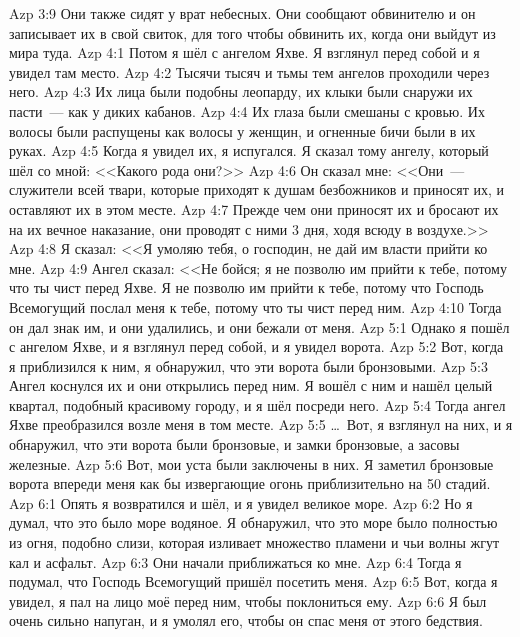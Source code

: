 \vs Azp 3:9
Они также сидят у врат небесных.
Они сообщают обвинителю и он записывает их в свой свиток,
для того чтобы обвинить их, когда они выйдут из мира туда.
\vs Azp 4:1
Потом я шёл с ангелом Яхве.
Я взглянул перед собой и я увидел там место.
\vs Azp 4:2
Тысячи тысяч и тьмы тем ангелов проходили через него.
\vs Azp 4:3
Их лица были подобны леопарду,
их клыки были снаружи их пасти~--- как у диких кабанов.
\vs Azp 4:4
Их глаза были смешаны с кровью.
Их волосы были распущены как волосы у женщин,
и огненные бичи были в их руках.
\vs Azp 4:5
Когда я увидел их, я испугался.
Я сказал тому ангелу, который шёл со мной:
<<Какого рода они?>>
\vs Azp 4:6
Он сказал мне:
<<Они~--- служители всей твари, которые приходят
к душам безбожников и приносят их,
и оставляют их в этом месте.
\vs Azp 4:7
Прежде чем они приносят их и бросают их
на их вечное наказание, они проводят с ними 3 дня,
ходя всюду в воздухе.>>
\vs Azp 4:8
Я сказал:
<<Я умоляю тебя, о господин, не дай им власти прийти ко мне.
\vs Azp 4:9
Ангел сказал:
<<Не бойся; я не позволю им прийти к тебе,
потому что ты чист перед Яхве.
Я не позволю им прийти к тебе,
потому что Господь Всемогущий послал меня к тебе,
потому что ты чист перед ним.
\vs Azp 4:10
Тогда он дал знак им, и они удалились, и они бежали от меня.
\vs Azp 5:1
Однако я пошёл с ангелом Яхве,
и я взглянул перед собой, и я увидел ворота.
\vs Azp 5:2
Вот, когда я приблизился к ним, я обнаружил,
что эти ворота были бронзовыми.
\vs Azp 5:3
Ангел коснулся их и они открылись перед ним.
Я вошёл с ним и нашёл целый квартал,
подобный красивому городу, и я шёл посреди него.
\vs Azp 5:4
Тогда ангел Яхве преобразился возле меня в том месте.
\vs Azp 5:5
\ldots\ Вот, я взглянул на них, и я обнаружил,
что эти ворота были бронзовые, и замки бронзовые,
а засовы железные.
\vs Azp 5:6
Вот, мои уста были заключены в них.
Я заметил бронзовые ворота впереди меня
как бы извергающие огонь приблизительно на 50 стадий.
\vs Azp 6:1
Опять я возвратился и шёл,
и я увидел великое море.
\vs Azp 6:2
Но я думал, что это было море водяное.
Я обнаружил, что это море было полностью из огня,
подобно слизи, которая изливает множество пламени
и чьи волны жгут кал и асфальт.
\vs Azp 6:3
Они начали приближаться ко мне.
\vs Azp 6:4
Тогда я подумал, что Господь Всемогущий пришёл посетить меня.
\vs Azp 6:5
Вот, когда я увидел, я пал на лицо моё перед ним,
чтобы поклониться ему.
\vs Azp 6:6
Я был очень сильно напуган, и я умолял его,
чтобы он спас меня от этого бедствия.
